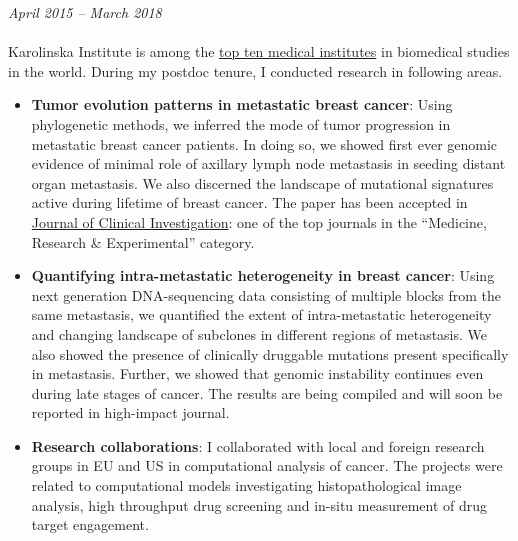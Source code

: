 \documentclass[margin, 10pt]{res} %
\begin{document}
\begin{resume}
{\sl \textbf{}} \hfill \textit{April 2015 -- March 2018} \\
{\color{RubineRed}{Radiumhemmet, Karolinska University Hospital}} \\
Karolinska Institute is among the \href{https://www.topuniversities.com/universities/karolinska-institutet/undergrad}{top ten medical institutes} in biomedical studies in the world. During my postdoc tenure, I conducted research in following areas.
\begin{itemize}
\item \textbf{Tumor evolution patterns in metastatic breast cancer}: Using phylogenetic methods, we inferred the mode of tumor progression in metastatic breast cancer patients. In doing so, we showed first ever genomic evidence of minimal role of axillary lymph node metastasis in seeding distant organ metastasis. We also discerned the landscape of mutational signatures active during lifetime of breast cancer. The paper has been accepted in \href{https://www.jci.org/kiosks/about}{Journal of Clinical Investigation}: one of the top journals in the “Medicine, Research \& Experimental” category.
\item \textbf{Quantifying intra-metastatic heterogeneity in breast cancer}: Using next generation DNA-sequencing data consisting of multiple blocks from the same metastasis, we quantified the extent of intra-metastatic heterogeneity and changing landscape of subclones in different regions of metastasis. We also showed the presence of clinically druggable mutations present specifically in metastasis. Further, we showed that genomic instability continues even during late stages of cancer. The results are being compiled and will soon be reported in high-impact journal.
\item \textbf{Research collaborations}: I collaborated with local and foreign research groups in EU and US in computational analysis of cancer. The projects were related to computational models investigating histopathological image analysis, high throughput drug screening and in-situ measurement of drug target engagement.
\end{itemize}



\end{resume}
\end{document}
